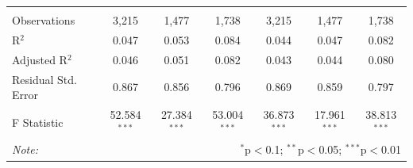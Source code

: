 \documentclass[alpha-refs]{wiley-article-01g}
\begin{document}
\begin{landscape}
\begin{table}[!htbp]
\begin{tabular}{@{\extracolsep{5pt}}lcccccc}
			& & & & & & \\ 
			\hline \\[-.8ex] 
			Observations & 3,215 & 1,477 & 1,738 & 3,215 & 1,477 & 1,738 \\ 
			R$^{2}$ & 0.047 & 0.053 & 0.084 & 0.044 & 0.047 & 0.082 \\ 
			Adjusted R$^{2}$ & 0.046 & 0.051 & 0.082 & 0.043 & 0.044 & 0.080 \\ 
			Residual Std. Error & 0.867 & 0.856 & 0.796 & 0.869 & 0.859 & 0.797 \\ 
			F Statistic & 52.584$^{***}$ & 27.384$^{***}$ & 53.004$^{***}$ & 36.873$^{***}$ & 17.961$^{***}$ & 38.813$^{***}$ \\ 
			\hline 

			\textit{Note:}  & \multicolumn{6}{r}{$^{*}$p$<$0.1; $^{**}$p$<$0.05; $^{***}$p$<$0.01} \\ 
		\end{tabular} 
	\end{table} 
	
\end{landscape}

\newpage
\end{document}
